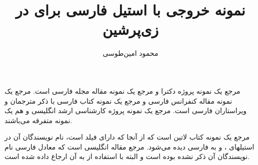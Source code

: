\documentclass[11pt,a4paper]{article}
\title{نمونه خروجی با استیل فارسی \lr{asa-fa} برای \lr{BibTeX} در زی‌پرشین}
\author{محمود امین‌طوسی}\date{}
\begin{document}
\maketitle

مرجع \cite{Omidali82phdThesis} یک نمونه پروژه دکترا و مرجع \cite{Vahedi87} یک نمونه مقاله مجله فارسی است.
مرجع \citep{Amintoosi87afzayesh}  یک نمونه  مقاله کنفرانس فارسی و
مرجع \cite{Pedram80osool} یک نمونه کتاب فارسی با ذکر مترجمان و ویراستاران فارسی است. مرجع \cite{Khalighi07MscThesis} یک نمونه پروژه کارشناسی ارشد انگلیسی و
\cite{Khalighi87xepersian} هم یک نمونه متفرقه  می‌باشند.

مرجع \cite{Gonzalez02book} یک نمونه کتاب لاتین است که از آنجا که دارای فیلد  است، نام نویسندگان آن در استیلهای ،  و  به فارسی دیده می‌شود. مرجع  مقاله انگلیسی است که معادل فارسی نام نویسندگان آن ذکر نشده بوده است و البته با استفاده از  به آن ارجاع داده شده است.


{\small



}
\end{document}
